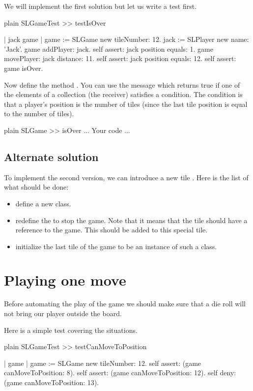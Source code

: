 \documentclass[10pt,twoside,english]{_support/latex/sbabook/sbabook}
\begin{document}
We will implement the first solution but let us write a test first.

\begin{displaycode}{plain}
SLGameTest >> testIsOver
	
	| jack game |
	game := SLGame new tileNumber: 12.
	jack := SLPlayer new name: 'Jack'.
	game addPlayer: jack. 
	self assert: jack position equals: 1. 
	game movePlayer: jack distance: 11.
	self assert: jack position equals: 12.
	self assert: game isOver.
\end{displaycode}

Now define the method . You can use the  message which returns true if one of the elements of a collection (the receiver) satisfies a condition. The condition is that a player's position is the number of tiles (since the last tile position is equal to the number of tiles).

\begin{displaycode}{plain}
SLGame >> isOver
	... Your code ...
\end{displaycode}
\subsection{Alternate solution}
To implement the second version, we can introduce a new tile .
Here is the list of what should be done:

\begin{itemize}
\item define a new class.
\item redefine the  to stop the game. Note that it means that the tile should have a reference to the game. This should be added to this special tile.
\item initialize the last tile of the game to be an instance of such a class.
\end{itemize}
\section{Playing one move}
Before automating the play of the game we should make sure that a die roll will not bring our player outside the board.

Here is a simple test covering the situations.

\begin{displaycode}{plain}
SLGameTest >> testCanMoveToPosition
	
	| game |
	game := SLGame new tileNumber: 12.
	self assert: (game canMoveToPosition: 8).
	self assert: (game canMoveToPosition: 12).
	self deny: (game canMoveToPosition: 13).
\end{displaycode}
\end{document}
